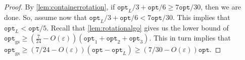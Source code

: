 \documentclass[10pt,a4paper]{amsart}
\newcommand{\kvnr}[1]{}
\newcommand{\eps}{\varepsilon}
\renewcommand{\epsilon}{\varepsilon} %
\theoremstyle{definition}
\newcommand{\opt}{\mathtt{opt}}
\newcommand{\optgs}{\mathtt{opt}_{\mathrm{gs}}}
\begin{document}
\begin{proof}
    By \cref{lem:containerrotation}, if $\opt_L/3+\opt/6\ge 7\opt/30$, then we are done.
    So, assume now that $\opt_L/3+\opt/6< 7\opt/30$. This implies that $\opt_L< \opt/5$.
    Recall that \cref{lem:rotationalgo} gives us the lower bound of $\optgs\ge (\frac{7}{24}-O(\epsilon))(\opt_1+\opt_2+\opt_3)$.
    This in turn implies that $\optgs\ge (7/24-O(\epsilon))(\opt-\opt_L)\ge (7/30-O(\eps))\opt$. 

\end{proof}
\end{document}

